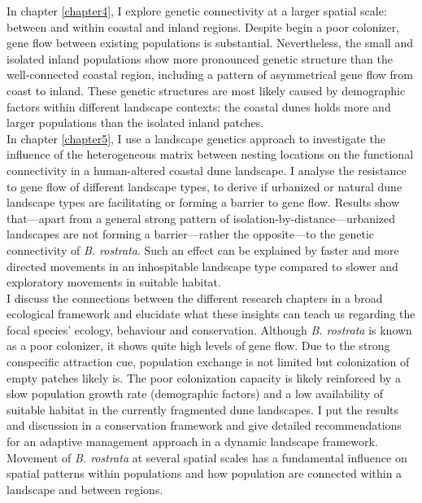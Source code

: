 \documentclass[10pt, twoside]{book} %
\begin{document}
In chapter \ref{chapter4}, I explore genetic connectivity at a larger spatial scale: between and within coastal and inland regions. Despite begin a poor colonizer, gene flow between existing populations is substantial. Nevertheless, the small and isolated inland populations show more pronounced genetic structure than the well-connected coastal region, including a pattern of asymmetrical gene flow from coast to inland. These genetic structures are most likely caused by demographic factors within different landscape contexts: the coastal dunes holds more and larger populations than the isolated inland patches.\\

In chapter \ref{chapter5}, I use a landscape genetics approach to investigate the influence of the heterogeneous matrix between nesting locations on the functional connectivity in a human-altered coastal dune landscape. I analyse the resistance to gene flow of different landscape types, to derive if urbanized or natural dune landscape types are facilitating or forming a barrier to gene flow. Results show that---apart from a general strong pattern of isolation-by-distance---urbanized landscapes are not forming a barrier---rather the opposite---to the genetic connectivity of \textit{B. rostrata}. Such an effect can be explained by faster and more directed movements in an inhospitable landscape type compared to slower and exploratory movements in suitable habitat.\\

I discuss the connections between the different research chapters in a broad ecological framework and elucidate what these insights can teach us regarding the focal species' ecology, behaviour and conservation. Although \textit{B. rostrata} is known as a poor colonizer, it shows quite high levels of gene flow. Due to the strong conspecific attraction cue, population exchange is not limited but colonization of empty patches likely is. The poor colonization capacity is likely reinforced by a slow population growth rate (demographic factors) and a low availability of suitable habitat in the currently fragmented dune landscapes. I put the results and discussion in a conservation framework and give detailed recommendations for an adaptive management approach in a dynamic landscape framework. Movement of \textit{B. rostrata} at several spatial scales has a fundamental influence on spatial patterns within populations and how population are connected within a landscape and between regions.\\
\end{document}
